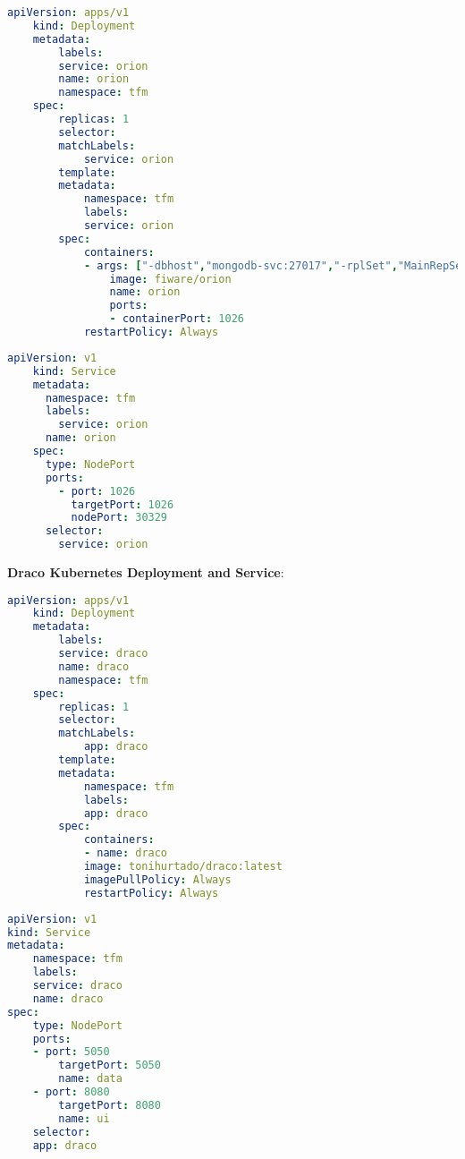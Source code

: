 \begin{lstlisting}[language=yaml,caption=Kubernetes YAML definition file for Orion Deployment, label=OrionKubernetes]
    apiVersion: apps/v1
    kind: Deployment
    metadata:
        labels:
        service: orion
        name: orion
        namespace: tfm
    spec:
        replicas: 1
        selector:
        matchLabels:
            service: orion
        template:
        metadata:
            namespace: tfm
            labels:
            service: orion
        spec:
            containers:
            - args: ["-dbhost","mongodb-svc:27017","-rplSet","MainRepSet","-logLevel","DEBUG","-httpTimeout","15000","-dbDisableRetryWrites","-port","1026"] 
                image: fiware/orion
                name: orion
                ports:
                - containerPort: 1026
            restartPolicy: Always
\end{lstlisting}


\begin{lstlisting}[language=yaml,caption=Kubernetes YAML definition file for Orion Service, label=OrionKubernetesService]
    apiVersion: v1
    kind: Service
    metadata:
      namespace: tfm
      labels:
        service: orion
      name: orion
    spec:
      type: NodePort
      ports:
        - port: 1026
          targetPort: 1026
          nodePort: 30329
      selector:
        service: orion
\end{lstlisting}

\textbf{Draco Kubernetes Deployment and Service}:

\begin{lstlisting}[language=yaml,caption=Kubernetes YAML definition file for Draco Deployment., label=DracoKubernetes]
    apiVersion: apps/v1
    kind: Deployment
    metadata:
        labels:
        service: draco
        name: draco
        namespace: tfm
    spec:
        replicas: 1
        selector:
        matchLabels:
            app: draco
        template:
        metadata:
            namespace: tfm
            labels:
            app: draco
        spec:
            containers:
            - name: draco
            image: tonihurtado/draco:latest
            imagePullPolicy: Always
            restartPolicy: Always
\end{lstlisting}

\begin{lstlisting}[language=yaml,caption=Kubernetes YAML definition file for Draco Service., label=DracoKubernetesService]
apiVersion: v1
kind: Service
metadata:
    namespace: tfm
    labels:
    service: draco  
    name: draco
spec:
    type: NodePort
    ports:
    - port: 5050
        targetPort: 5050
        name: data
    - port: 8080
        targetPort: 8080
        name: ui
    selector:
    app: draco
\end{lstlisting}